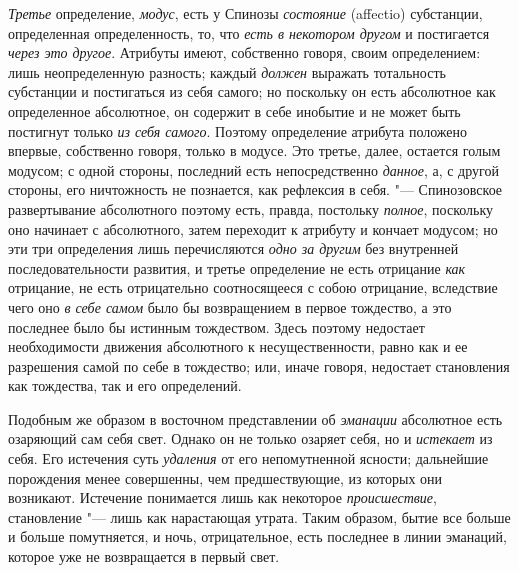{\em Третье} определение,
{\em модус}, есть у Спинозы
{\em состояние} (affectio) субстанции, определенная
определенность, то, что {\em есть в некотором другом} и
постигается {\em через это другое}. Атрибуты имеют,
собственно говоря, своим определением: лишь неопределенную разность; каждый
{\em должен} выражать тотальность субстанции и
постигаться из себя самого; но поскольку он есть абсолютное как
определенное абсолютное, он содержит в себе инобытие и не может быть
постигнут только {\em из себя самого}. Поэтому
определение атрибута положено впервые, собственно говоря, только в модусе.
Это третье, далее, остается голым модусом; с одной стороны, последний есть
непосредственно {\em данное}, а, с другой стороны, его
ничтожность не познается, как рефлексия в себя. "--- Спинозовское
развертывание абсолютного поэтому есть, правда, постольку
{\em полное}, поскольку оно начинает с абсолютного,
затем переходит к атрибуту и кончает модусом; но эти три определения лишь
перечисляются {\em одно за другим} без внутренней
последовательности развития, и третье определение не есть отрицание
{\em как} отрицание, не есть отрицательно соотносящееся
с собою отрицание, вследствие чего оно {\em в себе
самом} было бы возвращением в первое тождество, а это последнее было бы
истинным тождеством. Здесь поэтому недостает необходимости движения
абсолютного к несущественности, равно как и ее разрешения самой по себе в
тождество; или, иначе говоря, недостает становления как тождества, так и
его определений.

Подобным же образом в восточном представлении об
{\em эманации} абсолютное есть озаряющий сам себя свет.
Однако он не только озаряет себя, но и {\em истекает}
из себя. Его истечения суть {\em удаления} от его
непомутненной ясности; дальнейшие порождения менее совершенны, чем
предшествующие, из которых они возникают. Истечение понимается лишь как
некоторое {\em происшествие}, становление "--- лишь как
нарастающая утрата. Таким образом, бытие все больше и больше помутняется, и
ночь, отрицательное, есть последнее в линии эманаций, которое уже не
возвращается в первый свет.

